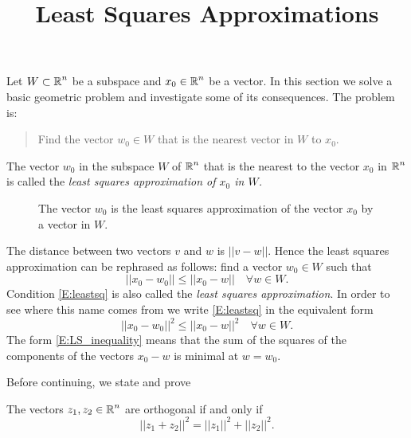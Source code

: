 \documentclass{ximera}
\title{Least Squares Approximations}
\begin{document}
\begin{abstract}
\end{abstract}
\maketitle

  \label{S:LSA}

Let $W\subset\mbox{$\mathbb{R}$}^n$ be a subspace and $x_0\in\mbox{$\mathbb{R}$}^n$ be a vector.  In this
section we solve a basic geometric problem and investigate some of its
consequences.  The problem is:
\begin{quote}
Find the vector $w_0\in W$ that is the nearest vector in $W$ to $x_0$.
\end{quote}

\begin{definition} \rm \label{D:least_squares}
The vector $w_0$ in the subspace $W$ of $\mbox{$\mathbb{R}$}^n$ that is the nearest to the 
vector $x_0$ in $\mbox{$\mathbb{R}$}^n$ is called the \em{least squares approximation} of 
$x_0$ in $W$.
\end{definition} 

\begin{figure}[htb]
        \centerline{%
        }
        \caption{The vector $w_0$ is the least squares approximation of the vector $x_0$ by a vector in $W$.}
        \label{F:nearest}
\end{figure}


The distance between two vectors
$v$ and $w$ is $||v-w||$.  Hence the least squares approximation 
can be rephrased as follows: find a vector $w_0\in W$ such that
\begin{equation}  \label{E:leastsq}
||x_0-w_0||\leq ||x_0-w|| \quad \forall w\in W.
\end{equation}
Condition \eqref{E:leastsq} is also called the
{\em least squares approximation}.
In order to see where this name comes from we write \eqref{E:leastsq} in the
equivalent form
\begin{equation} \label{E:LS_inequality}
||x_0-w_0||^2\leq ||x_0-w||^2 \quad \forall w\in W.
\end{equation}
The form \eqref{E:LS_inequality} means that the sum of the squares of the
components of the vectors $x_0 - w$ is minimal at $w = w_0$.

Before continuing, we state and prove 
\begin{lemma}   \label{L:LP}
The vectors $z_1,z_2\in\mbox{$\mathbb{R}$}^n$ are orthogonal if and only if  
\begin{equation} \label{E:LP}
||z_1+z_2||^2 = ||z_1||^2 + ||z_2||^2.
\end{equation}
\end{lemma}
\end{document}

